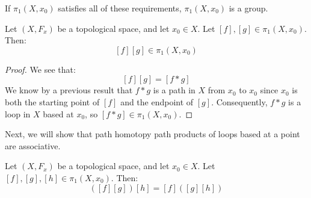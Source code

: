 If $\pi_1(X,x_0)$ satisfies all of these requirements, $\pi_1(X,x_0)$ is a group.

\begin{lemma} [Closure] Let $(X,F_x)$ be a topological space, and let $x_0\in X$. Let $[f],[g]\in \pi_1(X,x_0)$. Then:
\[[f][g] \in \pi_1(X,x_0)\]
\end{lemma}

\begin{proof}
We see that:
\[[f][g] = [f*g]\]
We know by a previous result that $f*g$ is a path in $X$ from $x_0$ to $x_0$ since $x_0$ is both the starting point of $[f]$ and the endpoint of $[g]$. Consequently, $f*g$ is a loop in $X$ based at $x_0$, so $[f*g] \in \pi_1(X,x_0)$. 
\end{proof}

Next, we will show that path homotopy path products of loops based at a point are associative. 
\begin{lemma}[Associativity] Let $(X,F_x)$ be a topological space, and let $x_0\in X$. Let $[f],[g],[h]\in \pi_1(X,x_0)$. Then:
\[ ([f][g])[h] = [f]([g][h])\]
\end{lemma}

